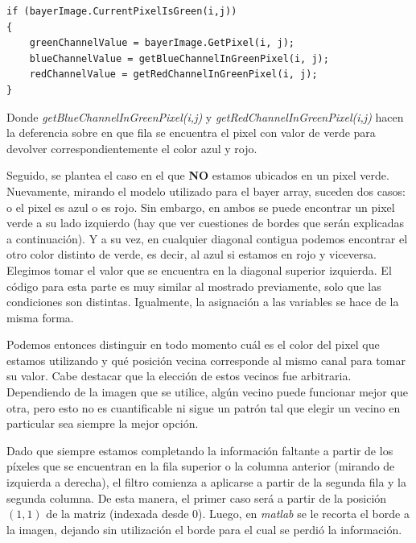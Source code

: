\vspace{\baselineskip}

\begin{lstlisting}
if (bayerImage.CurrentPixelIsGreen(i,j))
{
	greenChannelValue = bayerImage.GetPixel(i, j);
	blueChannelValue = getBlueChannelInGreenPixel(i, j);
	redChannelValue = getRedChannelInGreenPixel(i, j);
}
\end{lstlisting}

\vspace{\baselineskip}

Donde \textit{getBlueChannelInGreenPixel(i,j)} y \textit{getRedChannelInGreenPixel(i,j)} hacen la deferencia sobre en que fila se encuentra el pixel con valor de verde para devolver correspondientemente el color azul y rojo.

\vspace{\baselineskip}

Seguido, se plantea el caso en el que \textbf{NO} estamos ubicados en un pixel verde. Nuevamente, mirando el modelo utilizado para el bayer array, suceden dos casos: o el pixel es azul o es rojo. Sin embargo, en ambos se puede encontrar un pixel verde a su lado izquierdo (hay que ver cuestiones de bordes que serán explicadas a continuación). Y a su vez, en cualquier diagonal contigua podemos encontrar el otro color distinto de verde, es decir, al azul si estamos en rojo y viceversa. Elegimos tomar el valor que se encuentra en la diagonal superior izquierda. El código para esta parte es muy similar al mostrado previamente, solo que las condiciones son distintas. Igualmente, la asignación a las variables se hace de la misma forma.

\vspace{\baselineskip}

Podemos entonces distinguir en todo momento cuál es el color del pixel que estamos utilizando y qué posición vecina corresponde al mismo canal para tomar su valor. Cabe destacar que la elección de estos vecinos fue arbitraria. Dependiendo de la imagen que se utilice, algún vecino puede funcionar mejor que otra, pero esto no es cuantificable ni sigue un patrón tal que elegir un vecino en particular sea siempre la mejor opción.

\vspace{\baselineskip}

Dado que siempre estamos completando la información faltante a partir de los píxeles que se encuentran en la fila superior o la columna anterior (mirando de izquierda a derecha), el filtro comienza a aplicarse a partir de la segunda fila y la segunda columna. De esta manera, el primer caso será a partir de la posición $(1,1)$ de la matriz (indexada desde 0). Luego, en \textit{matlab} se le recorta el borde a la imagen, dejando sin utilización el borde para el cual se perdió la información.

